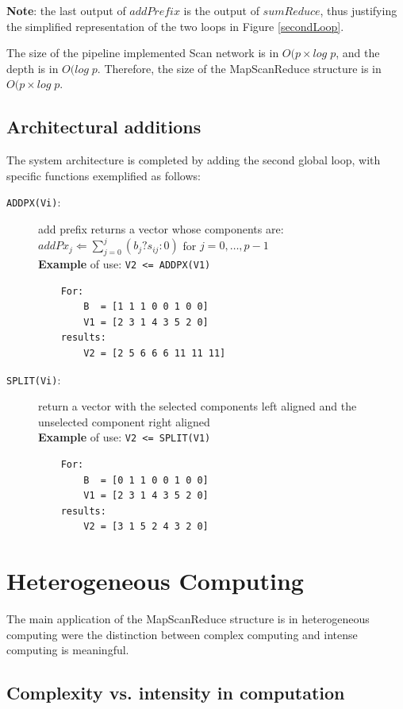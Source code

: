 {\bf Note}: the last output of $addPrefix$ is the output of $sumReduce$, thus justifying the simplified representation of the two loops in Figure \ref{secondLoop}.

The size of the pipeline implemented Scan network is in $O(p \times log \; p$, and the depth is in $O(log \; p$. Therefore, the size of the MapScanReduce structure is in $O(p \times log \; p$.

\subsection{Architectural additions}\label{scanEx}

The system architecture is completed by adding the second global loop, with  specific functions exemplified as follows:
\begin{description}
    \item[{\tt ADDPX(Vi)}:] add prefix returns a vector whose components are:\\
        $addPx_j \Leftarrow \sum_{j=0}^{j} (b_j ? s_{ij} : 0)$ for $j = 0, \ldots, p-1$ \\
         {\bf Example} of use: {\tt V2 <= ADDPX(V1)} \\
    \begin{verbatim}
    For:
        B  = [1 1 1 0 0 1 0 0]
        V1 = [2 3 1 4 3 5 2 0]
    results:
        V2 = [2 5 6 6 6 11 11 11]
    \end{verbatim}
    \item[{\tt SPLIT(Vi)}:] return a vector with the selected components left aligned and the unselected component right aligned  \\
     {\bf Example} of use: {\tt V2 <= SPLIT(V1)} \\
    \begin{verbatim}
    For:
        B  = [0 1 1 0 0 1 0 0]
        V1 = [2 3 1 4 3 5 2 0]
    results:
        V2 = [3 1 5 2 4 3 2 0]
    \end{verbatim}
\end{description}

\section{Heterogeneous Computing}

The main application of the MapScanReduce structure is in heterogeneous computing were the distinction between complex computing and intense computing is meaningful.

\subsection{Complexity vs. intensity in computation}

